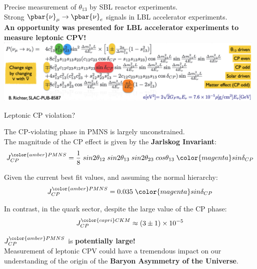 %
%
%
%
\begin{frame}{}

\begin{center}
Precise measurement of $\theta_{13}$ by SBL reactor experiments.\\
\vspace{0.2cm}
Strong $\pbar{\nu}_{\mu} \rightarrow \pbar{\nu}_{e}$ signals in LBL accelerator experiments.\\
\vspace{0.5cm}
{\bf An opportunity was presented for LBL accelerator experiments to measure leptonic CPV!}
\vspace{1.5cm}
\includegraphics[width=0.98\textwidth]{./images/osc101/numu2nue_full}
\end{center}

\end{frame}

%
%
%
\begin{frame}{Leptonic CP violation?}

The CP-violating phase in PMNS is largely unconstrained.\\
\vspace{0.2cm}
The magnitude of the CP effect  is given by the {\bf Jarlskog Invariant}:
\begin{equation*}
  J_{CP}^{{\color{amber}PMNS}} = \frac{1}{8} \; sin2\theta_{12} \; sin2\theta_{13} \;
     sin2\theta_{23} \; cos\theta_{13} \; {\color{magenta}
       sin\delta_{CP} }
\end{equation*}

Given the current best fit values, and assuming the normal hierarchy:
\begin{equation*}
  J_{CP}^{{\color{amber}PMNS}} = 0.035 \; {\color{magenta}sin\delta_{CP}}
\end{equation*}

In contrast, in the quark sector, despite the large value of the
CP phase:
\begin{equation*}
  J_{CP}^{{\color{capri}CKM}} \approx  (3 \pm 1) \times 10^{-5}
\end{equation*}

$J_{CP}^{{\color{amber}PMNS}}$ is {\bf potentially large!} \\
\vspace{0.2cm}
Measurement of leptonic CPV could have a tremendous impact on our understanding of the
origin of the {\bf Baryon Asymmetry of the Universe}.

\end{frame}

